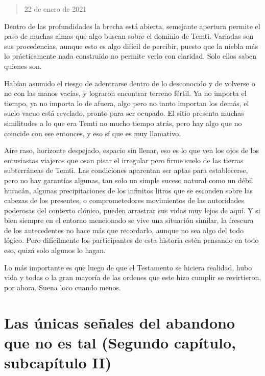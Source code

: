 \documentclass[
  spanish,
]{book}
\begin{document}
\begin{quote}
22 de enero de 2021
\end{quote}

Dentro de las profundidades la brecha está abierta, semejante apertura permite el paso de muchas almas que algo buscan sobre el dominio de Temti. Variadas son sus procedencias, aunque esto es algo difícil de percibir, puesto que la niebla más lo prácticamente nada construido no permite verlo con claridad. Solo ellos saben quienes son.

Habían asumido el riesgo de adentrarse dentro de lo desconocido y de volverse o no con las manos vacías, y lograron encontrar terreno fértil. Ya no importa el tiempo, ya no importa lo de afuera, algo pero no tanto importan los demás, el suelo vacuo está revelado, pronto para ser ocupado. El sitio presenta muchas similitudes a lo que era Temti no mucho tiempo atrás, pero hay algo que no coincide con ese entonces, y eso sí que es muy llamativo.

Aire raso, horizonte despejado, espacio sin llenar, eso es lo que ven los ojos de los entusiastas viajeros que osan pisar el irregular pero firme suelo de las tierras subterráneas de Temti. Las condiciones aparentan ser aptas para establecerse, pero no hay garantías algunas, tan solo un simple suceso natural como un débil huracán, algunas precipitaciones de los infinitos litros que se esconden sobre las cabezas de los presentes, o comprometedores movimientos de las autoridades poderosas del contexto clónico, pueden arrastrar sus vidas muy lejos de aquí. Y si bien siempre en el entorno mencionado se vive una situación similar, la frescura de los antecedentes no hace más que recordarlo, aunque no sea algo del todo lógico. Pero difícilmente los participantes de esta historia estén pensando en todo eso, quizá solo algunos lo hagan.

Lo más importante es que luego de que el Testamento se hiciera realidad, hubo vida y todas o la gran mayoría de las ordenes que este hizo cumplir se revirtieron, por ahora. Suena loco cuando menos.

\hypertarget{las-uxfanicas-seuxf1ales-del-abandono-que-no-es-tal-segundo-capuxedtulo-subcapuxedtulo-ii}{%
\section{Las únicas señales del abandono que no es tal (Segundo capítulo, subcapítulo II)}\label{las-uxfanicas-seuxf1ales-del-abandono-que-no-es-tal-segundo-capuxedtulo-subcapuxedtulo-ii}}
\end{document}
